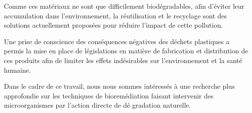\par{
Comme ces mat\'eriaux ne sont que difficilement biod\'egradables, afin d'\'eviter leur accumulation dans l'environnement, la r\'eutilisation et le recyclage sont des solutions actuellement propos\'ees pour r\'eduire l'impact de cette pollution. 
}\\
\par{
Une prise de conscience des cons\'equences n\'egatives des d\'echets plastiques a permis la mise en place de  l\'egislations en mati\`ere de fabrication et distribution de ces produits afin de limiter les effets ind\'esirables sur l'environnement et la sant\'e humaine.
}\\
\par{
Dans le cadre de ce travail, nous nous sommes int\'eress\'es \`a une recherche plus approfondie sur les techniques de biorem\'ediation faisant intervenir des microorganismes par l'action directe de d\'e
gradation naturelle. 
}

